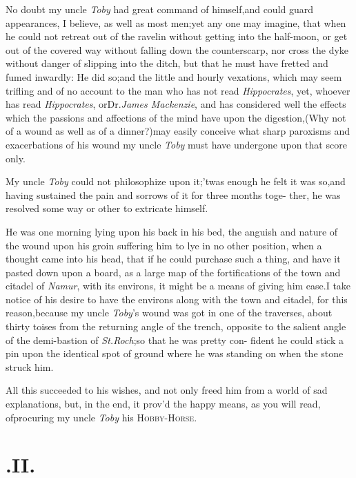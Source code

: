 \documentclass{article}
\begin{document}
No doubt my uncle \textit{Toby} had great command of
himself,\tsk and could guard appearances, I believe, as well as
most men;\tsk yet any one may imagine, that when he could not
retreat out of the ravelin without getting into the half-moon,
or get out of the covered way without falling down the
counterscarp, nor cross the dyke without danger of slipping into
the ditch, but that he must have fretted and fumed inwardly:\tsk
He did so;\tsk and the little and hourly vexations, which may
seem trifling and of no account to the man who has not read
\textit{Hippocrates}, yet, whoever has read
\textit{Hippocrates}, or\break Dr.\@ \textit{James Mackenzie},
and has considered well the effects which the passions and
affections of the mind have upon the digestion,\tsk (Why not of a
wound as well as of a dinner?)\tsk may easily conceive what
sharp paroxisms and exacerbations of his wound my uncle
\textit{Toby} must have undergone upon that score only.

\tsk My uncle \textit{Toby} could not philoso\-phize upon
it;\tsk ’twas enough he felt it\break
was so,\tsk and having sustained the pain\break
and sorrows of it for three months toge- ther, he was resolved some
way or other to extricate himself.

He was one morning lying upon his back in his bed, the anguish and nature\break
of the wound upon his groin suffering him to lye in no other position, when a
thought came into his head, that if he could purchase such a thing, and have it
pasted down upon a board, as a large map of the fortifications of the town and
citadel of \textit{Namur}, with its environs, it might be a means of giving him
ease.\tsk\break I take notice of his desire to have the environs along with the
town and cita\-del, for this reason,\tsk because my uncle \textit{Toby}’s
wound was got in one of the traverses, about thirty toises from the returning
angle of the trench, opposite to the salient angle of the demi-bastion of
\textit{St.\@ Roch};\tsh so that he was pretty con- fident he could stick a
pin upon the identical spot of ground where he was standing on when the stone
struck him.


All this succeeded to his wishes, and not only freed him from a
world of sad explanations, but, in the end, it prov’d\break
the happy means, as you will read, of\break procuring my
uncle \textit{Toby} his \textsc{Hobby-}\break\textsc{Horse}.


\null
\section{.\enspace  II.}
\end{document}
